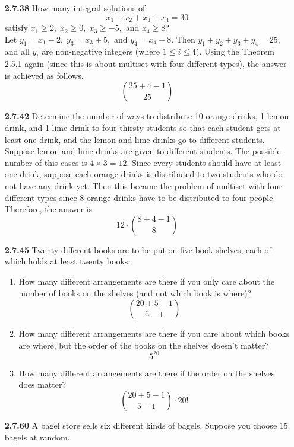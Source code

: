 \documentclass[12pt]{article}
\begin{document}
\begin{itemize}
    \item[\bf 2.7.38] How many integral solutions of
    $$x_1+x_2+x_3+x_4 = 30$$
    satisfy $x_1\ge 2,\; x_2\ge 0,\; x_3\ge -5,$ and $x_4\ge 8$?\\
    
    Let $y_1 = x_1-2,\; y_3 = x_3+5,\text{ and } y_4 = x_4-8$. Then $y_1+y_2+y_3+y_4=25,$ and all $y_i$ are non-negative integers (where $1\le i\le 4$). Using the Theorem 2.5.1 again (since this is about multiset with four different types), the answer is achieved as follows.
    $$\binom{25+4-1}{25}$$
    
    \item[\bf 2.7.42] Determine the number of ways to distribute 10 orange drinks, 1 lemon drink, and 1 lime drink to four thirsty students so that each student gets at least one drink, and the lemon and lime drinks go to different students.\\
    
    Suppose lemon and lime drinks are given to different students. The possible number of this cases is $4\times 3=12$. Since every students should have at least one drink, suppose each orange drinks is distributed to two students who do not have any drink yet. Then this became the problem of multiset with four different types since 8 orange drinks have to be distributed to four people. Therefore, the answer is $$12\cdot \binom{8+4-1}{8}$$
    
    \item[\bf 2.7.45] Twenty different books are to be put on five book shelves, each of which holds at least twenty books.
    \begin{enumerate}[label=(\alph*)]
        \item How many different arrangements are there if you only care about the number of books on the shelves (and not which book is where)?
        $$\binom{20+5-1}{5-1}$$
        
        \item How many different arrangements are there if you care about which books are where, but the order of the books on the shelves doesn't matter?
        $$5^{20}$$
        
        \item How many different arrangements are there if the order on the shelves does matter?
        $$\binom{20+5-1}{5-1}\cdot 20!$$
    \end{enumerate}
    
    \newpage
    \item[\bf 2.7.60] A bagel store sells six different kinds of bagels. Suppose you choose 15 bagels at random. 
    

\end{itemize}
\end{document}

